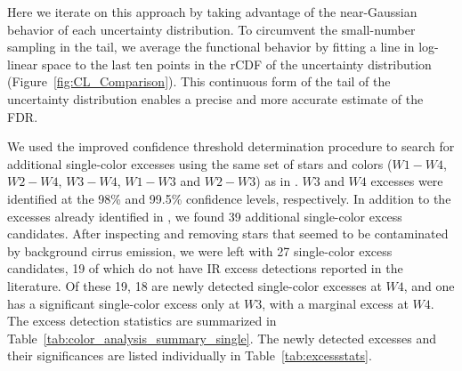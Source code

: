     Here we iterate on this approach by taking advantage of the near-Gaussian behavior of each uncertainty distribution. To circumvent the small-number sampling in the tail, we average the functional behavior by fitting a line in log-linear space to the last ten points in the rCDF of the uncertainty distribution (Figure~\ref{fig:CL_Comparison}). This continuous form of the tail of the uncertainty distribution enables a precise and more accurate estimate of the FDR. 


        
        
    We used the improved confidence threshold determination procedure to search for additional single-color excesses using the same set of stars and colors ($W1-W4$, $W2-W4$, $W3-W4$, $W1-W3$ and $W2-W3$) as in . $W3$ and $W4$ excesses were identified at the 98\% and 99.5\% confidence levels, respectively. In addition to the excesses already identified in , we found 39 additional single-color excess candidates. After inspecting and removing stars that seemed to be contaminated by background cirrus emission, we were left with 27 single-color excess candidates, 19 of which do not have IR excess detections reported in the literature. Of these 19, 18 are newly detected single-color excesses at $W4$, and one has a significant single-color excess only at $W3$, with a marginal excess at $W4$. The excess detection statistics are summarized in Table~\ref{tab:color_analysis_summary_single}. The newly detected excesses and their significances are listed individually in Table~\ref{tab:excessstats}.
        
